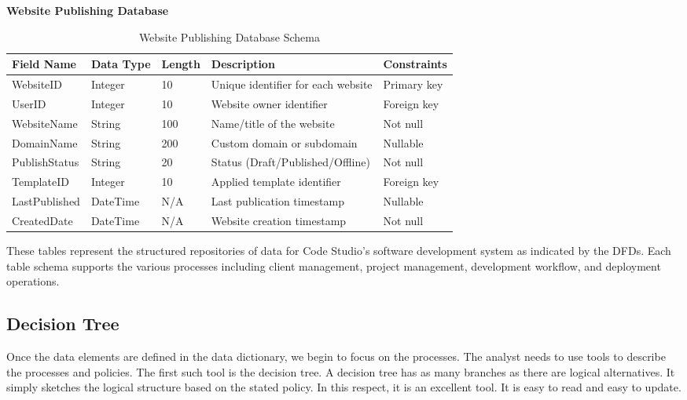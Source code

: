 \documentclass[12pt,a4paper]{article}
\begin{document}
\newpage
{\color{orange!80}\large\textbf{Website Publishing Database}}

\begin{table}[H]
\centering
\renewcommand{\arraystretch}{1.2}
\begin{tabular}{|p{2.5cm}|p{1.8cm}|p{1.4cm}|p{5cm}|p{2.5cm}|}
\hline
\rowcolor{orange!20}
\textbf{Field Name} & \textbf{Data Type} & \textbf{Length} & \textbf{Description} & \textbf{Constraints} \\
\hline
WebsiteID & Integer & 10 & Unique identifier for each website & Primary key \\
\hline
UserID & Integer & 10 & Website owner identifier & Foreign key \\
\hline
WebsiteName & String & 100 & Name/title of the website & Not null \\
\hline
DomainName & String & 200 & Custom domain or subdomain & Nullable \\
\hline
PublishStatus & String & 20 & Status (Draft/Published/Offline) & Not null \\
\hline
TemplateID & Integer & 10 & Applied template identifier & Foreign key \\
\hline
LastPublished & DateTime & N/A & Last publication timestamp & Nullable \\
\hline
CreatedDate & DateTime & N/A & Website creation timestamp & Not null \\
\hline
\end{tabular}
\caption{Website Publishing Database Schema}
\end{table}

These tables represent the structured repositories of data for Code Studio's software development system as indicated by the DFDs. Each table schema supports the various processes including client management, project management, development workflow, and deployment operations.

\subsection{Decision Tree}

Once the data elements are defined in the data dictionary, we begin to focus on the processes. The analyst needs to use tools to describe the processes and policies. The first such tool is the decision tree. A decision tree has as many branches as there are logical alternatives. It simply sketches the logical structure based on the stated policy. In this respect, it is an excellent tool. It is easy to read and easy to update.
\end{document}

